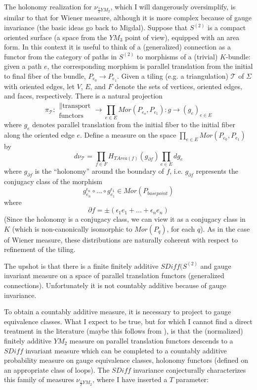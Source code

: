 \documentclass{amsart}
\theoremstyle{conjecture}
\theoremstyle{definition}
\theoremstyle{question}
\theoremstyle{questions}
\theoremstyle{remark}
\theoremstyle{remarks}
\theoremstyle{example}
\numberwithin{equation}{section}
\begin{document}
The holonomy realization for $ \nu_{\frac 1T YM_2}$, which I will dangerously oversimplify, is similar to that for Wiener measure, although it is more complex because of gauge invariance (the basic ideas go back to Migdal). Suppose that $S^{(2)}$ is a compact oriented surface (a space from the $YM_3$ point of view), equipped with an area form. In this context it is useful to think of a (generalized) connection as a functor from the category of paths in $S^{(2)}$ to morphisms of a (trivial) $K$-bundle: given a path $e$,
the corresponding morphism is parallel translation from the initial to final fiber of the bundle, $P_{e_0} \to P_{e_1}$. Given a tiling (e.g. a triangulation) $\mathcal T$ of $\Sigma$ with oriented edges, let $V$, $
E$, and $F$ 
denote the sets of vertices, oriented edges, and faces, 
respectively.  There is a natural projection 
$$\pi_{\mathcal T}:\begin{matrix}\parallel\text{transport}\\ \text{functors}\end{matrix}\to\prod_{e\in E}Mor(P_{e_o},P_{e_1}):g\to (g_
e)_{e\in E}$$
where $g_e$ denotes parallel translation from the initial fiber to 
the initial fiber along the oriented edge $e$. 
Define a measure on the space $\prod_{e\in E} Mor(P_{e_0},P_{e_1})$ by 
$$d\nu_{\mathcal T}=\prod_{f\in F}H_{T Area(f)}(g_{\partial f})\prod_{e
\in E}dg_e$$
where $g_{\partial f}$ is the ``holonomy'' around the boundary of $
f$, i.e. $g_{\partial f}$ 
represents the conjugacy class of the morphism
$$g_{e_n}^{\epsilon_n}\circ ...\circ g_{e_1}^{\epsilon_1}\in Mor(
P_{basepoint})$$
where
$$\partial f=\pm (\epsilon_1e_1+...+\epsilon_ne_n)$$
(Since the holonomy is a conjugacy class, we can view it as a 
conjugacy class in $K$ (which is non-canonically isomorphic to 
$Mor(P_q)$, for each $q$). As in the case of Wiener measure, these distributions are naturally coherent with respect to 
refinement of the tiling.

The upshot is that there is a finite finitely additive $SDiff(S^{(2)}$ and gauge invariant measure on a space of parallel translation functors (generalized connections). 
Unfortunately it is not countably additive because of gauge invariance. 

To obtain a countably additive measure, it is necessary to project to gauge equivalence classes. What I expect to be true, but for which I cannot find a direct treatment in the literature (maybe this follows from \cite{TLevy}), is that the (normalized) finitely additive $YM_2$ measure on parallel translation functors descends to a $SDiff$ invariant measure which can be completed to a countably additive probability measure on gauge equivalence classes, holonomy functors (defined on an appropriate class of loops). The $SDiff$ invariance conjecturally characterizes this family of measures $\nu_{\frac 1T YM_2}$, where I have inserted a $T$ parameter:
\end{document}
